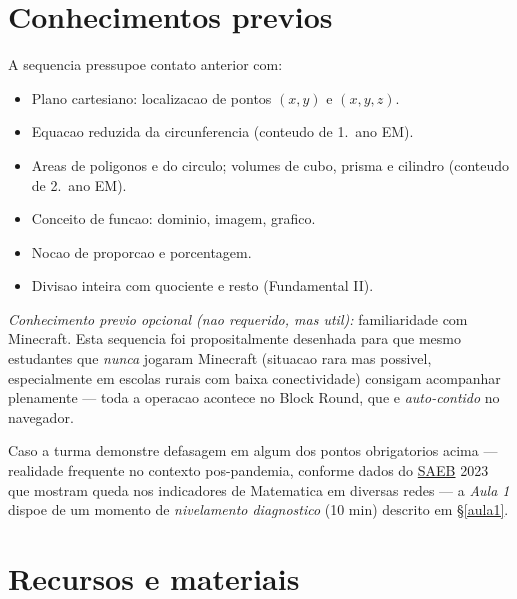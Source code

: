 \documentclass[12pt,a4paper]{scrartcl}
\begin{document}
\section{Conhecimentos previos}\label{sec:prerrequisitos}

A sequencia pressupoe contato anterior com:

\begin{itemize}[leftmargin=1.3em,itemsep=0.15em,topsep=0.3em]
  \item Plano cartesiano: localizacao de pontos $(x, y)$ e $(x, y, z)$.
  \item Equacao reduzida da circunferencia (conteudo de 1.\textordmasculine\ ano EM).
  \item Areas de poligonos e do circulo; volumes de cubo, prisma e cilindro (conteudo de 2.\textordmasculine\ ano EM).
  \item Conceito de funcao: dominio, imagem, grafico.
  \item Nocao de proporcao e porcentagem.
  \item Divisao inteira com quociente e resto (Fundamental II).
\end{itemize}

\emph{Conhecimento previo opcional (nao requerido, mas util):} familiaridade com Minecraft. Esta sequencia foi propositalmente desenhada para que mesmo estudantes que \emph{nunca} jogaram Minecraft (situacao rara mas possivel, especialmente em escolas rurais com baixa conectividade) consigam acompanhar plenamente --- toda a operacao acontece no Block Round, que e \emph{auto-contido} no navegador.

Caso a turma demonstre defasagem em algum dos pontos obrigatorios acima --- realidade frequente no contexto pos-pandemia, conforme dados do \href{https://www.gov.br/inep/pt-br/areas-de-atuacao/avaliacao-e-exames-educacionais/saeb}{SAEB} 2023 que mostram queda nos indicadores de Matematica em diversas redes --- a \emph{Aula 1} dispoe de um momento de \emph{nivelamento diagnostico} (10 min) descrito em §\ref{aula1}.

\section{Recursos e materiais}\label{sec:recursos}
\end{document}
